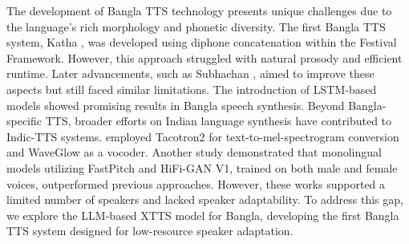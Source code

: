 

The development of Bangla TTS technology presents unique challenges due to the language's rich morphology and phonetic diversity. The first Bangla TTS system, Katha \cite{alam2007text}, was developed using diphone concatenation within the Festival Framework. However, this approach struggled with natural prosody and efficient runtime. Later advancements, such as Subhachan \cite{naser2010implementation}, aimed to improve these aspects but still faced similar limitations. The introduction of LSTM-based models \cite{gutkin2016tts} showed promising results in Bangla speech synthesis. Beyond Bangla-specific TTS, broader efforts on Indian language synthesis have contributed to Indic-TTS systems. \citet{Prakash2020} employed Tacotron2 for text-to-mel-spectrogram conversion and WaveGlow as a vocoder. Another study \cite{indictts2022} demonstrated that monolingual models utilizing FastPitch and HiFi-GAN V1, trained on both male and female voices, outperformed previous approaches. However, these works supported a limited number of speakers and lacked speaker adaptability. To address this gap, we explore the LLM-based XTTS model for Bangla, developing the first Bangla TTS system designed for low-resource speaker adaptation.






